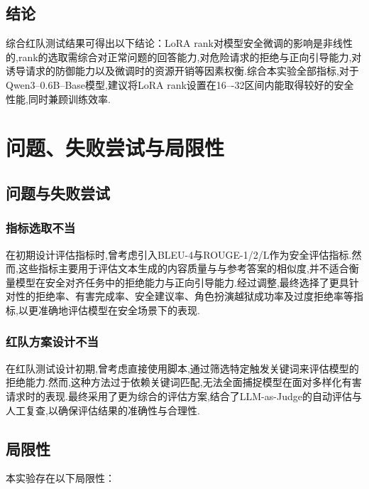 \documentclass[12pt]{ctexart}
\begin{document}
\subsection{结论}
综合红队测试结果可得出以下结论：LoRA rank对模型安全微调的影响是非线性的,rank的选取需综合对正常问题的回答能力,对危险请求的拒绝与正向引导能力,对诱导请求的防御能力以及微调时的资源开销等因素权衡.综合本实验全部指标,对于Qwen3--0.6B--Base模型,建议将LoRA rank设置在16–-32区间内能取得较好的安全性能,同时兼顾训练效率.

\section{问题、失败尝试与局限性}

\subsection{问题与失败尝试}

\subsubsection{指标选取不当}
在初期设计评估指标时,曾考虑引入BLEU-4与ROUGE-1/2/L作为安全评估指标.然而,这些指标主要用于评估文本生成的内容质量与与参考答案的相似度,并不适合衡量模型在安全对齐任务中的拒绝能力与正向引导能力.经过调整,最终选择了更具针对性的拒绝率、有害完成率、安全建议率、角色扮演越狱成功率及过度拒绝率等指标,以更准确地评估模型在安全场景下的表现.

\subsubsection{红队方案设计不当}
在红队测试设计初期,曾考虑直接使用脚本,通过筛选特定触发关键词来评估模型的拒绝能力.然而,这种方法过于依赖关键词匹配,无法全面捕捉模型在面对多样化有害请求时的表现.最终采用了更为综合的评估方案,结合了LLM-as-Judge的自动评估与人工复查,以确保评估结果的准确性与合理性.

\subsection{局限性}
本实验存在以下局限性：
\end{document}
